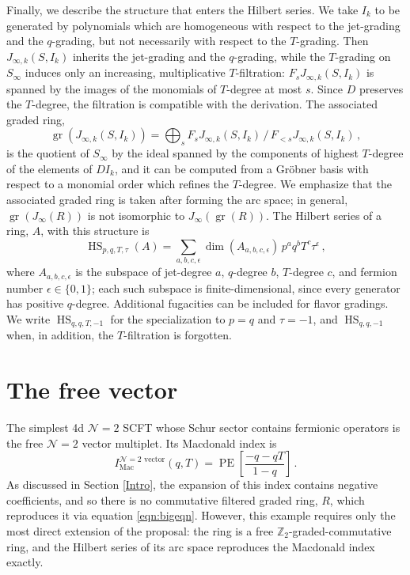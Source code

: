 \documentclass[12pt]{article}
\numberwithin{equation}{section}
\numberwithin{figure}{section}
\theoremstyle{plain}
\theoremstyle{definition}
\begin{document}
Finally, we describe the structure that enters the Hilbert series. We take $I_k$ to be generated by polynomials which are homogeneous with respect to the jet-grading and the $q$-grading, but not necessarily with respect to the $T$-grading. Then $J_{\infty,k}(S, I_k)$ inherits the jet-grading and the $q$-grading, while the $T$-grading on $S_\infty$ induces only an increasing, multiplicative $T$-filtration: $F_s J_{\infty,k}(S, I_k)$ is spanned by the images of the monomials of $T$-degree at most $s$. Since $D$ preserves the $T$-degree, the filtration is compatible with the derivation. The associated graded ring,
\begin{equation}
    \operatorname{gr}(J_{\infty,k}(S, I_k)) = \bigoplus_s F_s J_{\infty,k}(S, I_k) \, / \, F_{<s} J_{\infty,k}(S, I_k) \,,
\end{equation}
is the quotient of $S_\infty$ by the ideal spanned by the components of highest $T$-degree of the elements of $DI_k$, and it can be computed from a Gr\"obner basis with respect to a monomial order which refines the $T$-degree. We emphasize that the associated graded ring is taken after forming the arc space; in general, $\operatorname{gr}(J_\infty(R))$ is not isomorphic to $J_\infty(\operatorname{gr}(R))$. The Hilbert series of a ring, $A$, with this structure is
\begin{equation}
    \operatorname{HS}_{p,q,T,\tau}(A) = \sum_{a,b,c,\epsilon} \dim(A_{a,b,c,\epsilon}) \, p^a q^b T^c \tau^\epsilon \,,
\end{equation}
where $A_{a,b,c,\epsilon}$ is the subspace of jet-degree $a$, $q$-degree $b$, $T$-degree $c$, and fermion number $\epsilon \in \{0, 1\}$; each such subspace is finite-dimensional, since every generator has positive $q$-degree. Additional fugacities can be included for flavor gradings. We write $\operatorname{HS}_{q,q,T,-1}$ for the specialization to $p = q$ and $\tau = -1$, and $\operatorname{HS}_{q,q,-1}$ when, in addition, the $T$-filtration is forgotten.

\section{The free \texorpdfstring{}{N=2} vector}\label{sec:vec}

The simplest 4d $\mathcal{N}=2$ SCFT whose Schur sector contains fermionic operators is the free $\mathcal{N}=2$ vector multiplet. Its Macdonald index is \cite{Gadde:2011uv}
\begin{equation}\label{eqn:freebigmac}
    I_\text{Mac}^{\mathcal{N}=2\text{ vector}}(q, T) = \operatorname{PE} \left[ \frac{-q-qT}{1-q} \right] \,.
\end{equation}
As discussed in Section \ref{Intro}, the expansion of this index contains negative coefficients, and so there is no commutative filtered graded ring, $R$, which reproduces it via equation \eqref{eqn:bigeqn}. However, this example requires only the most direct extension of the proposal: the ring is a free $\mathbb{Z}_2$-graded-commutative ring, and the Hilbert series of its arc space reproduces the Macdonald index exactly.
\end{document}
